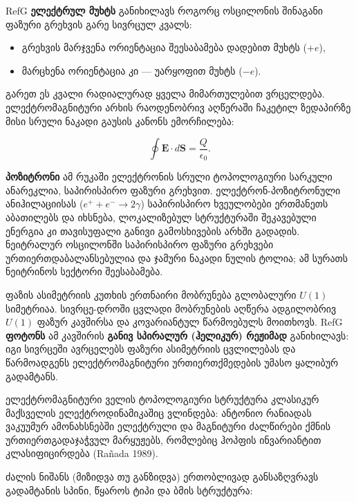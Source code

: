 \documentclass[11pt,a4paper]{article}
\begin{document}
RefG \textbf{ელექტრულ მუხტს} განიხილავს როგორც ოსცილონის შინაგანი ფაზური გრეხვის გარე სივრცულ კვალს:

\begin{itemize}
\item გრეხვის მარჯვენა ორიენტაცია შეესაბამება დადებით მუხტს ($+e$),
\item მარცხენა ორიენტაცია კი — უარყოფით მუხტს ($-e$).

\end{itemize}
გარეთ ეს კვალი რადიალურად ყველა მიმართულებით ვრცელდება. ელექტრომაგნიტური არხის რაოდენობრივ აღწერაში ჩაკეტილ ზედაპირზე მისი სრული ნაკადი გაუსის კანონს ემორჩილება:

\[
\oint \mathbf{E} \cdot d\mathbf{S} = \frac{Q}{\epsilon_0}.
\]

\textbf{პოზიტრონი} ამ რუკაში ელექტრონის სრული ტოპოლოგიური სარკული ანარეკლია, საპირისპირო ფაზური გრეხვით. ელექტრონ-პოზიტრონული ანიჰილაციისას ($e^+ + e^- \to 2\gamma$) საპირისპირო ხვეულობები ერთმანეთს აბათილებს და იხსნება, ლოკალიზებულ სტრუქტურაში შეკავებული ენერგია კი თავისუფალი განივი გამოსხივების არხში გადადის. ნეიტრალურ ოსცილონში საპირისპირო ფაზური გრეხვები ურთიერთდაბალანსებულია და ჯამური ნაკადი ნულის ტოლია; ამ სურათს ნეიტრინოს სექტორი შეესაბამება.

ფაზის ასიმეტრიის კუთხის ერთნაირი მობრუნება გლობალური $U(1)$ სიმეტრიაა. სივრცე-დროში ცვლადი მობრუნების აღწერა ადგილობრივ $U(1)$ ფაზურ კავშირსა და კოვარიანტულ წარმოებულს მოითხოვს. RefG \textbf{ფოტონს} ამ კავშირის \textbf{განივ სპირალურ (ჰელიკურ) რეჟიმად} განიხილავს: იგი სივრცეში ავრცელებს ფაზური ასიმეტრიის ცვლილებას და წარმოადგენს ელექტრომაგნიტური ურთიერთქმედების უმასო ყალიბურ გადამტანს.

ელექტრომაგნიტური ველის ტოპოლოგიური სტრუქტურა კლასიკურ მაქსველის ელექტროდინამიკაშიც ვლინდება: ანტონიო რანიადას ვაკუუმურ ამონახსნებში ელექტრული და მაგნიტური ძალწირები ქმნის ურთიერთგადაჯაჭვულ მარყუჟებს, რომლებიც ჰოპფის ინვარიანტით კლასიფიცირდება (Rañada 1989).

ძალის ნიშანს (მიზიდვა თუ განზიდვა) ერთობლივად განსაზღვრავს გადამტანის სპინი, წყაროს ტიპი და ბმის სტრუქტურა:
\end{document}

